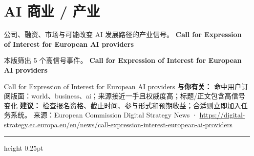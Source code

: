 \documentclass[10.5pt]{ctexart}
\begin{document}
\section*{AI 商业 / 产业}
{\color{ormuted} 公司、融资、市场与可能改变 AI 发展路径的产业信号。}
\vspace{2mm}
{\LARGE\bfseries Call for Expression of Interest for European AI providers}\par
\vspace{1mm}
{\color{ormuted} 本版筛出 5 个高信号事件。}
\vspace{3mm}
{\Large\bfseries Call for Expression of Interest for European AI providers}\par
Call for Expression of Interest for European AI providers
\textbf{与你有关：} 命中用户订阅版面：world、business、ai；来源接近一手且权威度高；标题/正文包含高信号变化
\textbf{建议：} 检查报名资格、截止时间、参与形式和预期收益；合适则立即加入任务系统。
{\footnotesize\color{ormuted} 来源：European Commission Digital Strategy News · \url{https://digital-strategy.ec.europa.eu/en/news/call-expression-interest-european-ai-providers}}
\vspace{4mm}
\hrule height 0.25pt
\vspace{3mm}
\end{document}
